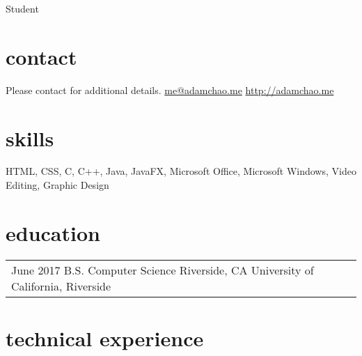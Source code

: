 \documentclass[print]{friggeri-cv} %
\makeatletter
\renewenvironment{entrylist}{%
	\par\begin{tabular*}{\textwidth}{@{\extracolsep{\fill}}ll}
	}{%
\end{tabular*}\par
}
\makeatother
\begin{document}
{Student} %


\begin{aside} %
\section{contact}
Please contact for additional details.
\href{mailto:me@adamchao.me}{me@adamchao.me}
\href{http://adamchao.me}{http://adamchao.me}
\section{skills}
HTML, CSS, C, C++, Java, JavaFX, Microsoft Office, Microsoft Windows, Video Editing, Graphic Design
\end{aside}


\section{education}

\begin{entrylist}
\entry
	{June 2017}
	{B.S. Computer Science}
	{Riverside, CA}
	{University of California, Riverside}
	
\end{entrylist}


\section{technical experience}
\end{document}
